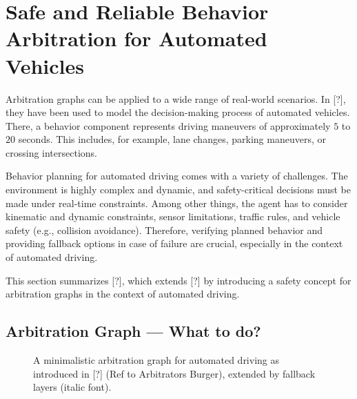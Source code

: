 \section{Safe and Reliable Behavior Arbitration for Automated Vehicles}




Arbitration graphs can be applied to a wide range of real-world scenarios.
In [?],
they have been used to model the decision-making process of automated vehicles.
There, a behavior component represents driving maneuvers of approximately $5$ to $20$ seconds.
This includes, for example, lane changes, parking maneuvers, or crossing intersections.

Behavior planning for automated driving comes with a variety of challenges.
The environment is highly complex and dynamic, and safety-critical decisions must be made under real-time constraints.
Among other things, the agent has to consider kinematic and dynamic constraints,
sensor limitations, traffic rules, and vehicle safety (e.g., collision avoidance).
Therefore, verifying planned behavior and providing fallback options in case of failure are crucial,
especially in the context of automated driving.

This section summarizes [?],
which extends [?] by
introducing a safety concept for arbitration graphs in the context of automated driving.




\subsection{Arbitration Graph --- \textbf{What} to do?}

\begin{figure}
    \centering
    
    \caption{
        A minimalistic arbitration graph for automated driving as introduced in [?] (Ref to Arbitrators Burger), extended by fallback layers (italic font).
    }
    \label{fig:arbitration-graph-evaluation}
\end{figure}


